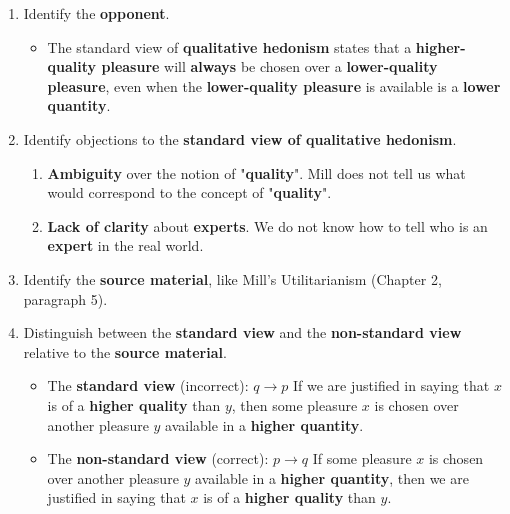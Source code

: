 \documentclass[11pt]{article}
\begin{document}
\begin{enumerate}
\item Identify the \textbf{opponent}.
\begin{itemize}
\item The standard view of \textbf{qualitative hedonism} states that a \textbf{higher-quality pleasure} will \textbf{always} be chosen over a \textbf{lower-quality pleasure}, even when the \textbf{lower-quality pleasure} is available is a \textbf{lower quantity}.
\end{itemize}
\item Identify objections to the \textbf{standard view of qualitative hedonism}.
\begin{enumerate}
\item \textbf{Ambiguity} over the notion of "\textbf{quality}". Mill does not tell us what would correspond to the concept of "\textbf{quality}".
\item \textbf{Lack of clarity} about \textbf{experts}. We do not know how to tell who is an \textbf{expert} in the real world.
\end{enumerate}
\item Identify the \textbf{source material}, like Mill's Utilitarianism (Chapter 2, paragraph 5).
\item Distinguish between the \textbf{standard view} and the \textbf{non-standard view} relative to the \textbf{source material}.
\begin{itemize}
\item The \textbf{standard view} (incorrect): \(q \rightarrow p\)
If we are justified in saying that \(x\) is of a \textbf{higher quality} than \(y\), then some pleasure \(x\) is chosen over another pleasure \(y\) available in a \textbf{higher quantity}.
\item The \textbf{non-standard view} (correct): \(p \rightarrow q\)
If some pleasure \(x\) is chosen over another pleasure \(y\) available in a \textbf{higher quantity}, then we are justified in saying that \(x\) is of a \textbf{higher quality} than \(y\).
\end{itemize}
\end{enumerate}

 \newpage
\end{document}
